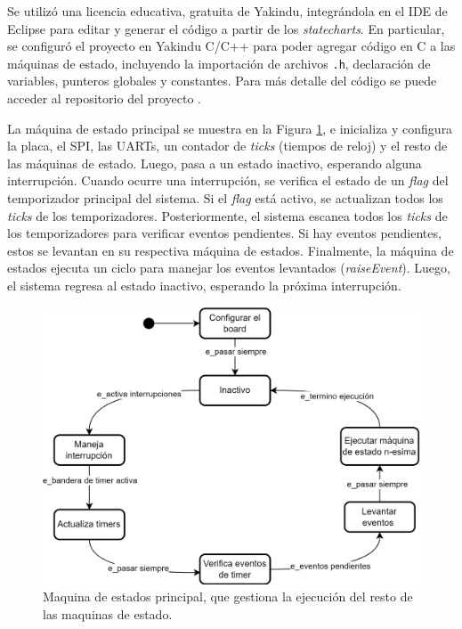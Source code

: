 Se utilizó una licencia educativa, gratuita de Yakindu, integrándola en el IDE de Eclipse para editar y generar el código a partir de los \textit{statecharts}. En particular, se configuró el proyecto en Yakindu C/C++ para poder agregar código en C a las máquinas de estado, incluyendo la importación de archivos \texttt{.h}, declaración de variables, punteros globales y constantes. Para más detalle del código se puede acceder al repositorio del proyecto \cite{FirmwareSCA2024}.

\newpage
La máquina de estado principal se muestra en la Figura \ref{fig:sc_main}, e inicializa y configura la placa, el SPI, las UARTs, un contador de \textit{ticks} (tiempos de reloj) y el resto de las máquinas de estado. Luego, pasa a un estado inactivo, esperando alguna interrupción. Cuando ocurre una interrupción, se verifica el estado de un \textit{flag} del temporizador principal del sistema. Si el \textit{flag} está activo, se actualizan todos los \textit{ticks} de los temporizadores. Posteriormente, el sistema escanea todos los \textit{ticks} de los temporizadores para verificar eventos pendientes. Si hay eventos pendientes, estos se levantan en su respectiva máquina de estados. Finalmente, la máquina de estados ejecuta un ciclo para manejar los eventos levantados (\textit{raiseEvent}). Luego, el sistema regresa al estado inactivo, esperando la próxima interrupción.

\begin{figure}[H]
    \centering
    \includegraphics[width=0.8\linewidth]{Figuras/datalogger/Firmware/sc_main.png}
    \caption{Maquina de estados principal, que gestiona la ejecución del resto de las maquinas de estado.}
    \label{fig:sc_main}
\end{figure}


